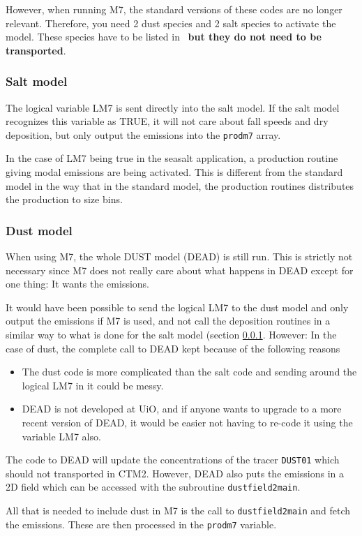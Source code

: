However, when running M7, the standard versions of these codes are
no longer relevant. Therefore, you need 2 dust species and 2 salt
species to activate the model. These species have to be listed in
\inptrctm\ {\bf but they do not need to be transported}.

\subsubsection{Salt model}
\label{sxn:salt2m7}

The logical variable LM7 is sent directly into the salt model.
If the salt model recognizes this variable as TRUE, it will
not care about fall speeds and dry deposition, but only output
the emissions into the \verb#prodm7# array.

In the case of LM7 being true in the seasalt application, a production
routine giving modal emissions are being activated. This is different
from the standard model in the way that in the standard model,
the production routines distributes the production to size bins.

\subsubsection{Dust model}

When using M7, the whole DUST model (DEAD) is still run. This is 
strictly not necessary since M7 does not really care about what
happens in DEAD except for one thing: It wants the emissions.

It would have been possible to send the logical LM7 to the dust model 
and only output the emissions if M7 is used, and not call the
deposition routines in a similar way to what is done for the salt
model (section \ref{sxn:salt2m7}. However: In the case of dust, 
the complete call to DEAD  kept because of the following reasons
\begin{itemize}
  \item The dust code is more complicated than the salt code and
    sending around the logical LM7 in it could be messy.
  \item DEAD is not developed at UiO, and if anyone wants to upgrade
    to a more recent version of DEAD, it would be easier not having to
    re-code it using the variable LM7 also.
\end{itemize}

The code to DEAD will update the concentrations of the tracer
\verb#DUST01# which should not transported in CTM2. However, DEAD also
puts the emissions in a 2D field which can be accessed with the
subroutine \verb#dustfield2main#.

All that is needed to include dust in M7 is the call to
\verb#dustfield2main# and fetch the emissions. These are then
processed in the \verb#prodm7# variable.

